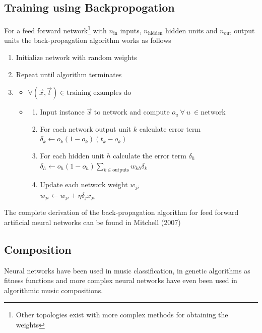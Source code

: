 \subsection{Training using Backpropogation}
For a feed forward network\footnote{Other topologies exist with more complex methods for obtaining the weights} with $n_\text{in}$ inputs, $n_\text{hidden}$ hidden units and $n_\text{out}$ output units the back-propagation algorithm works as follows
\begin{enumerate}
\item Initialize network with random weights
\item Repeat until algorithm terminates
\item 
\begin{itemize}
\item $\forall (\vec{x},\vec{t}) \in \text{training examples}$ do
\item 
\begin{enumerate}
\item Input instance $\vec{x}$ to network and compute $o_u\ \forall\ u\ \in \text{network}$
\item For each network output unit $k$ calculate error term\\
$\delta_k \leftarrow o_k (1-o_k)(t_k - o_k)$
\item For each hidden unit $h$ calculate the error term $\delta_h$\\
$\delta_h \leftarrow o_h (1- o_h) \sum_{k \in \text{outputs}} w_{kh}\delta_k$
\item Update each network weight $w_{ji}$\\
$w_{ji} \leftarrow w_{ji} + \eta \delta_j x_{ji}$
\end{enumerate}
\end{itemize}
\end{enumerate}
The complete derivation of the back-propagation algorithm for feed forward artificial neural networks can be found in Mitchell (2007) \cite{Mitchell1997}

\subsection{Composition}
Neural networks have been used in music classification, in genetic algorithms as fitness functions and more complex neural networks have even been used in algorithmic music compositions.


